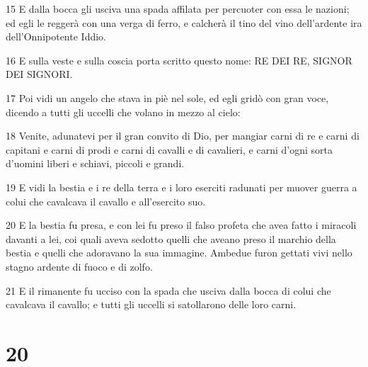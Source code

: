 \par 15 E dalla bocca gli usciva una spada affilata per percuoter con essa le nazioni; ed egli le reggerà con una verga di ferro, e calcherà il tino del vino dell'ardente ira dell'Onnipotente Iddio.
\par 16 E sulla veste e sulla coscia porta scritto questo nome: RE DEI RE, SIGNOR DEI SIGNORI.
\par 17 Poi vidi un angelo che stava in piè nel sole, ed egli gridò con gran voce, dicendo a tutti gli uccelli che volano in mezzo al cielo:
\par 18 Venite, adunatevi per il gran convito di Dio, per mangiar carni di re e carni di capitani e carni di prodi e carni di cavalli e di cavalieri, e carni d'ogni sorta d'uomini liberi e schiavi, piccoli e grandi.
\par 19 E vidi la bestia e i re della terra e i loro eserciti radunati per muover guerra a colui che cavalcava il cavallo e all'esercito suo.
\par 20 E la bestia fu presa, e con lei fu preso il falso profeta che avea fatto i miracoli davanti a lei, coi quali aveva sedotto quelli che aveano preso il marchio della bestia e quelli che adoravano la sua immagine. Ambedue furon gettati vivi nello stagno ardente di fuoco e di zolfo.
\par 21 E il rimanente fu ucciso con la spada che usciva dalla bocca di colui che cavalcava il cavallo; e tutti gli uccelli si satollarono delle loro carni.

\chapter{20}

